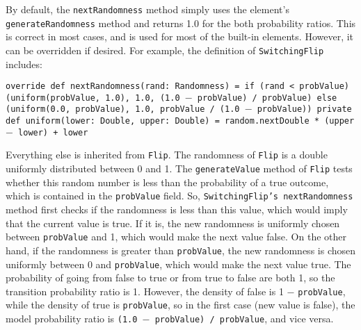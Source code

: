 By default, the \texttt{nextRandomness} method simply uses the element's \texttt{generateRandomness} method and returns 1.0 for the both probability ratios. This is correct in most cases, and is used for most of the built-in elements. However, it can be overridden if desired. For example, the definition of \texttt{SwitchingFlip} includes:

\begin{flushleft}
\texttt{override def nextRandomness(rand: Randomness) =
\newline \tab if (rand < probValue)
\newline \tab (uniform(probValue, 1.0), 1.0, (1.0 $-$ probValue) / probValue)
\newline \tab else (uniform(0.0, probValue), 1.0, probValue / (1.0 $-$ probValue))
\newline 
\newline private def uniform(lower: Double, upper: Double) =
\newline \tab random.nextDouble * (upper $-$ lower) + lower
}
\end{flushleft}

Everything else is inherited from \texttt{Flip}. The randomness of \texttt{Flip} is a double uniformly distributed between 0 and 1. The \texttt{generateValue} method of \texttt{Flip} tests whether this random number is less than the probability of a true outcome, which is contained in the \texttt{probValue} field. So, \texttt{SwitchingFlip's nextRandomness} method first checks if the randomness is less than this value, which would imply that the current value is true. If it is, the new randomness is uniformly chosen between \texttt{probValue} and
1, which would make the next value false. On the other hand, if the randomness is greater than \texttt{probValue}, the new randomness is chosen uniformly between 0 and \texttt{probValue}, which would make the next value true. The probability of going from false to true or from true to false are both 1, so the transition probability ratio is 1. However, the density of false is 1 $-$ \texttt{probValue}, while the density of true is \texttt{probValue}, so in the first case (new value is false), the model probability ratio is \texttt{(1.0 $-$ probValue) / probValue}, and vice versa.